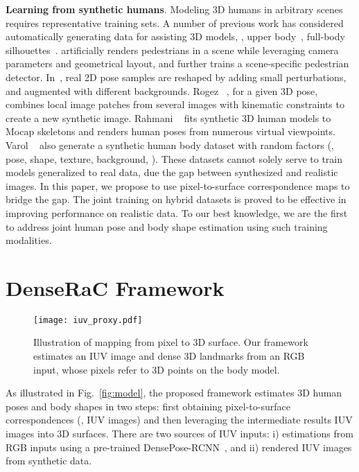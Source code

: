 \documentclass[10pt,twocolumn,letterpaper]{article}
\newcommand{\beforefigcaption}{\vspace{0mm}}
\newcommand{\afterfigcaption}{\vspace{0mm}}
\newcommand{\beforesection}{\vspace{0mm}}
\newcommand{\aftersection}{\vspace{0mm}}
\begin{document}
\noindent\textbf{Learning from synthetic humans}. Modeling 3D humans in arbitrary scenes requires representative training sets.
A number of previous work has considered automatically generating data for assisting 3D models, \eg, upper body~\cite{paul2003fast}, full-body silhouettes~\cite{agarwal2006recovering}. \cite{hattori2015learning} artificially renders pedestrians in a scene while leveraging camera parameters and geometrical layout, and further trains a scene-specific pedestrian detector.
In~\cite{pishchulin2012articulated}, real 2D pose samples are reshaped by adding small perturbations, and augmented with different backgrounds. Rogez \etal~\cite{rogez2016mocap}, for a given 3D pose, combines local image patches from several images with kinematic constraints to create a new synthetic image. Rahmani \etal~\cite{rahmani20163d} fits synthetic 3D human models to Mocap skeletons and renders human poses from numerous virtual viewpoints. Varol \etal~\cite{varol2017learning} also generate a synthetic human body dataset with random factors (\eg, pose, shape, texture, background, \etc). 
These datasets cannot solely serve to train models generalized to real data, due the gap between synthesized and realistic images. In this paper, we propose to use pixel-to-surface correspondence maps to bridge the gap. The joint training on hybrid datasets is proved to be effective in improving performance on realistic data. To our best knowledge, we are the first to address joint human pose and body shape estimation using such training modalities.

\beforesection
\section{DenseRaC Framework}
\aftersection

\begin{figure}[ptb]
\centering
\texttt{[image: iuv\_proxy.pdf]}
\beforefigcaption
\caption{Illustration of mapping from pixel to 3D surface. Our framework estimates an IUV image and dense 3D landmarks from an RGB input, whose pixels refer to 3D points on the body model.}
\afterfigcaption
\label{fig:densepose}
\end{figure}

As illustrated in Fig.~\ref{fig:model}, the proposed framework estimates 3D human poses and body shapes in two steps: first obtaining pixel-to-surface correspondences (\ie, IUV images) and then leveraging the intermediate results IUV images into 3D surfaces. There are two sources of IUV inputs: i) estimations from RGB inputs using a pre-trained DensePose-RCNN~\cite{DensePose2018}, and ii) rendered IUV images from synthetic data.
\end{document}
